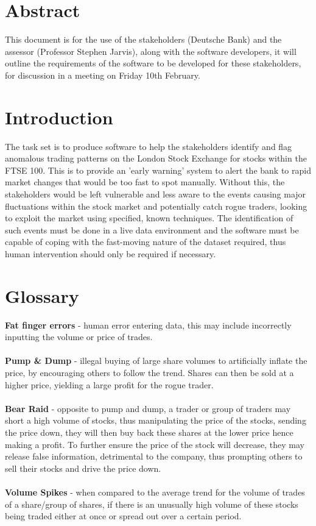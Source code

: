 \documentclass[10pt, oneside, a4paper]{article}
\begin{document}
\clearpage
\maketitle

\newpage
\setcounter{page}{1}

\section{Abstract}
This document is for the use of the stakeholders (Deutsche Bank) and the assessor (Professor Stephen Jarvis),
along with the software developers, it will outline the requirements of the software to be developed for
these stakeholders, for discussion in a meeting on Friday 10th February.

\section{Introduction}
The task set is to produce software to help the stakeholders identify and flag anomalous trading patterns
on the London Stock Exchange for stocks within the FTSE 100. This is to provide an 'early warning' system
to alert the bank to rapid market changes that would be too fast to spot manually. Without this, the
stakeholders would be left vulnerable and less aware to the events causing major fluctuations within the
stock market and potentially catch rogue traders, looking to exploit the market using specified, known
techniques. The identification of such events must be done in a live data environment and the software
must be capable of coping with the fast-moving nature of the dataset required, thus human intervention
should only be required if necessary.

\section{Glossary}
\textbf{Fat finger errors} - human error entering data, this may include incorrectly inputting the volume
or price of trades. \\\\
\textbf{Pump \& Dump} - illegal buying of large share volumes to artificially inflate the price, by encouraging
others to follow the trend. Shares can then be sold at a higher price, yielding a large profit for the rogue trader. \\\\
\textbf{Bear Raid} - opposite to pump and dump, a trader or group of traders may short a high volume of stocks,
thus manipulating the price of the stocks, sending the price down, they will then buy back these shares at the
lower price hence making a profit. To further ensure the price of the stock will decrease, they may release false
information, detrimental to the company, thus prompting others to sell their stocks and drive the price down. \\\\
\textbf{Volume Spikes} - when compared to the average trend for the volume of trades of a share/group of shares,
if there is an unusually high volume of these stocks being traded either at once or spread out over a certain period. \\\\
\end{document}
